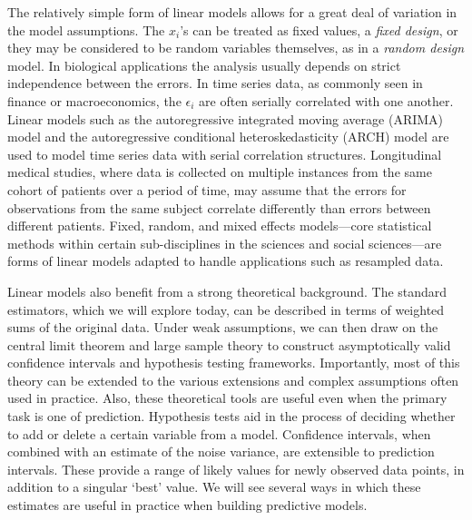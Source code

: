 \documentclass[12pt,hidelinks]{article}
\numberwithin{equation}{section}
\begin{document}
The relatively simple form of linear models allows for a
great deal of variation in the model assumptions. The $x_i$'s can
be treated as fixed values, a \textit{fixed design}, or they may
be considered to be random variables themselves, as in a
\textit{random design} model. In biological
applications the analysis usually depends on strict independence
between the errors. In time series data, as commonly seen in finance or macroeconomics,
the $\epsilon_i$ are often serially correlated with one another.
Linear models such as the autoregressive integrated
moving average (ARIMA) model and the autoregressive conditional heteroskedasticity
(ARCH) model are used to model time series data with serial correlation
structures. Longitudinal medical studies, where data is collected on
multiple instances from the same cohort of patients over a period of
time, may assume that the errors for observations from the
same subject correlate differently than errors between different
patients. Fixed, random, and mixed effects
models---core statistical methods within certain sub-disciplines in
the sciences and social sciences---are forms of linear models adapted
to handle applications such as resampled data.

Linear models also benefit from a strong theoretical background. The
standard estimators, which we will explore today,
can be described in terms of weighted sums of the original data. Under
weak assumptions, we can then draw on the central limit theorem and
large sample theory to construct asymptotically valid confidence
intervals and hypothesis testing frameworks. Importantly, most of this
theory can be extended to the various extensions and complex assumptions
often used in practice. Also, these theoretical tools are useful even
when the primary task is one of prediction. Hypothesis tests aid in
the process of deciding whether to add
or delete a certain variable from a model. Confidence intervals, when
combined with an estimate of the noise variance, are extensible to
prediction intervals. These provide a range of likely values for newly
observed data points, in addition to a singular `best' value. We
will see several ways in which these estimates are useful in practice
when building predictive models.
\end{document}
